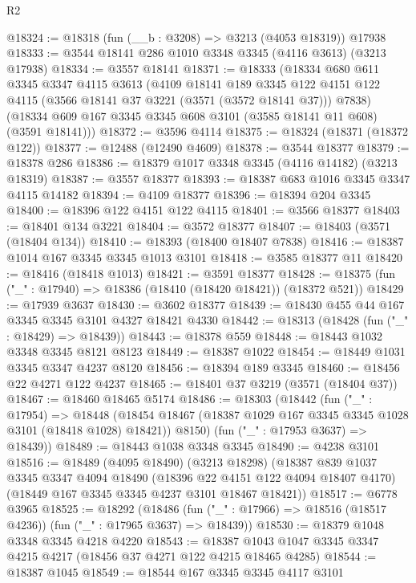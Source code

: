 \begin{lexlean}{R2}
\begin{coremodule}
@18324 := @18318 (fun (__b : @3208) => @3213 (@4053 @18319)) @17938
@18333 := @3544 @18141 @286 @1010 @3348 @3345 (@4116 @3613) (@3213 @17938)
@18334 := @3557 @18141
@18371 := @18333
    (@18334
      @680
      @611
      @3345
      @3347
      @4115
      @3613
      (@4109
        @18141
        @189
        @3345
        @122
        @4151
        @122
        @4115
        (@3566 @18141 @37 @3221 (@3571 (@3572 @18141 @37)))
        @7838)
      (@18334 @609 @167 @3345 @3345 @608 @3101 (@3585 @18141 @11 @608) (@3591 @18141)))
@18372 := @3596 @4114
@18375 := @18324 (@18371 (@18372 @122))
@18377 := @12488 (@12490 @4609)
@18378 := @3544 @18377
@18379 := @18378 @286
@18386 := @18379 @1017 @3348 @3345 (@4116 @14182) (@3213 @18319)
@18387 := @3557 @18377
@18393 := @18387 @683 @1016 @3345 @3347 @4115 @14182
@18394 := @4109 @18377
@18396 := @18394 @204 @3345
@18400 := @18396 @122 @4151 @122 @4115
@18401 := @3566 @18377
@18403 := @18401 @134 @3221
@18404 := @3572 @18377
@18407 := @18403 (@3571 (@18404 @134))
@18410 := @18393 (@18400 @18407 @7838)
@18416 := @18387 @1014 @167 @3345 @3345 @1013 @3101
@18418 := @3585 @18377 @11
@18420 := @18416 (@18418 @1013)
@18421 := @3591 @18377
@18428 := @18375 (fun ("_" : @17940) => @18386 (@18410 (@18420 @18421)) (@18372 @521))
@18429 := @17939 @3637
@18430 := @3602 @18377
@18439 := @18430 @455 @44 @167 @3345 @3345 @3101 @4327 @18421 @4330
@18442 := @18313 (@18428 (fun ("_" : @18429) => @18439))
@18443 := @18378 @559
@18448 := @18443 @1032 @3348 @3345 @8121 @8123
@18449 := @18387 @1022
@18454 := @18449 @1031 @3345 @3347 @4237 @8120
@18456 := @18394 @189 @3345
@18460 := @18456 @22 @4271 @122 @4237
@18465 := @18401 @37 @3219 (@3571 (@18404 @37))
@18467 := @18460 @18465 @5174
@18486 := @18303
    (@18442
      (fun ("_" : @17954) =>
      @18448
        (@18454 @18467 (@18387 @1029 @167 @3345 @3345 @1028 @3101 (@18418 @1028) @18421))
        @8150)
      (fun ("_" : @17953 @3637) => @18439))
@18489 := @18443 @1038 @3348 @3345
@18490 := @4238 @3101
@18516 := @18489
    (@4095 @18490)
    (@3213 @18298)
    (@18387
      @839
      @1037
      @3345
      @3347
      @4094
      @18490
      (@18396 @22 @4151 @122 @4094 @18407 @4170)
      (@18449 @167 @3345 @3345 @4237 @3101 @18467 @18421))
@18517 := @6778 @3965
@18525 := @18292
    (@18486 (fun ("_" : @17966) => @18516 (@18517 @4236)) (fun ("_" : @17965 @3637) => @18439))
@18530 := @18379 @1048 @3348 @3345 @4218 @4220
@18543 := @18387 @1043 @1047 @3345 @3347 @4215 @4217 (@18456 @37 @4271 @122 @4215 @18465 @4285)
@18544 := @18387 @1045
@18549 := @18544 @167 @3345 @3345 @4117 @3101

\end{coremodule}
\end{lexlean}
